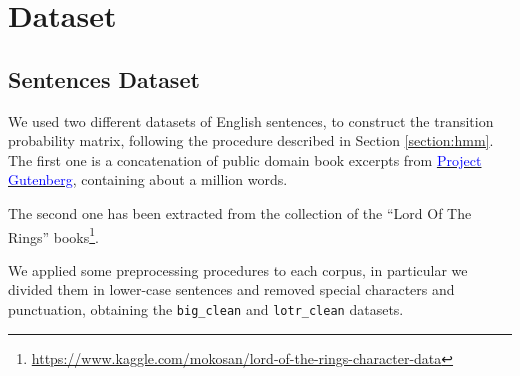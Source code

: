 \chapter{Dataset}

\section{Sentences Dataset}
\label{subsection:sencences_ds}
We used two different datasets of English sentences, to construct the transition probability matrix, following the 
procedure described in Section \ref{section:hmm}.\\
The first one is a concatenation of public domain book excerpts from 
\href{http://www.gutenberg.org/wiki/Main\_Page}{ 
	\textcolor{blue}{Project Gutenberg}}, containing about a million words. 

The second one has been extracted from the collection  of the “Lord Of The Rings” 
books\footnote{\url{https://www.kaggle.com/mokosan/lord-of-the-rings-character-data}}.

We applied some preprocessing procedures to each corpus, in particular we divided them in lower-case 
sentences and removed special characters and punctuation, obtaining the \texttt{big\_clean} and 
\texttt{lotr\_clean} datasets.


